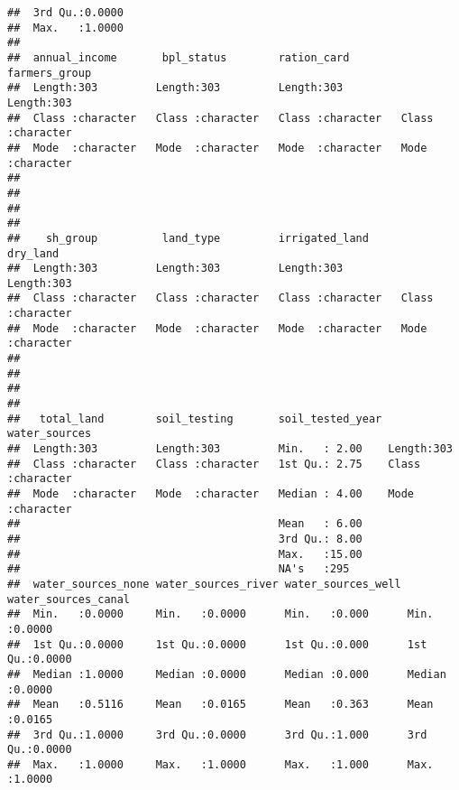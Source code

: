 \documentclass[
]{article}
\begin{document}
\begin{verbatim}
##  3rd Qu.:0.0000                                              
##  Max.   :1.0000                                              
##                                                              
##  annual_income       bpl_status        ration_card        farmers_group     
##  Length:303         Length:303         Length:303         Length:303        
##  Class :character   Class :character   Class :character   Class :character  
##  Mode  :character   Mode  :character   Mode  :character   Mode  :character  
##                                                                             
##                                                                             
##                                                                             
##                                                                             
##    sh_group          land_type         irrigated_land       dry_land        
##  Length:303         Length:303         Length:303         Length:303        
##  Class :character   Class :character   Class :character   Class :character  
##  Mode  :character   Mode  :character   Mode  :character   Mode  :character  
##                                                                             
##                                                                             
##                                                                             
##                                                                             
##   total_land        soil_testing       soil_tested_year water_sources     
##  Length:303         Length:303         Min.   : 2.00    Length:303        
##  Class :character   Class :character   1st Qu.: 2.75    Class :character  
##  Mode  :character   Mode  :character   Median : 4.00    Mode  :character  
##                                        Mean   : 6.00                      
##                                        3rd Qu.: 8.00                      
##                                        Max.   :15.00                      
##                                        NA's   :295                        
##  water_sources_none water_sources_river water_sources_well water_sources_canal
##  Min.   :0.0000     Min.   :0.0000      Min.   :0.000      Min.   :0.0000     
##  1st Qu.:0.0000     1st Qu.:0.0000      1st Qu.:0.000      1st Qu.:0.0000     
##  Median :1.0000     Median :0.0000      Median :0.000      Median :0.0000     
##  Mean   :0.5116     Mean   :0.0165      Mean   :0.363      Mean   :0.0165     
##  3rd Qu.:1.0000     3rd Qu.:0.0000      3rd Qu.:1.000      3rd Qu.:0.0000     
##  Max.   :1.0000     Max.   :1.0000      Max.   :1.000      Max.   :1.0000     

\end{verbatim}
\end{document}
